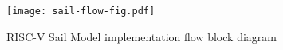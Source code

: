 \begin{figure}
    \centering
    \texttt{[image: sail-flow-fig.pdf]}
    \caption{RISC-V Sail Model implementation flow block diagram}
    \label{fig:sail-riscv}
\end{figure}
